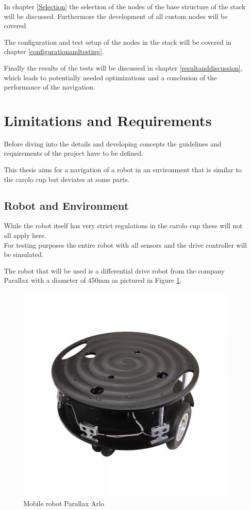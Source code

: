 In chapter \ref{Selection} the selection of the nodes of the base structure of the stack will be discussed. Furthermore the development of all custom nodes will be covered

The configuration and test setup of the nodes in the stack will be covered in chapter \ref{configurationandtesting}.


Finally the results of the tests will be discussed in chapter \ref{resultanddiscussion}, which leads to potentially needed optimizations and a conclusion of the performance of the navigation.

\section{Limitations and Requirements}

Before diving into the details and developing concepts the guidelines and requirements of the project have to be defined.

This thesis aims for a navigation of a robot in an environment that is similar to the carolo cup but deviates at some parts.

\subsection{Robot and Environment}
While the robot itself has very strict regulations in the carolo cup these will not all apply here.\\

For testing purposes the entire robot with all sensors and the drive controller will be simulated.

The robot that will be used is a differential drive robot from the company Parallax with a diameter of 450mm as pictured in Figure \ref{arlore}.\\

\begin{figure}[H]
	\centering
	\includegraphics[width=.7\textwidth]{arlo real}
	
	\caption{Mobile robot Parallax Arlo \cite{arloreal}}
	\label{arlore}
\end{figure}


